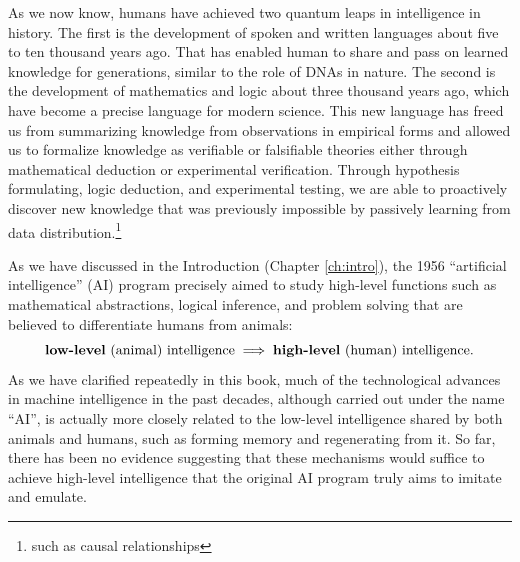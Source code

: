 \documentclass[../../book-main.tex]{subfiles}
\begin{document}




As we now know, humans have achieved two quantum leaps in intelligence in history. The first is the development of spoken and written languages about five to ten thousand years ago. That has enabled human to share and pass on learned knowledge for generations, similar to the role of DNAs in nature. The second is the development of mathematics and logic about three thousand years ago, which have become a precise language for modern science. This new language has freed us from summarizing knowledge from observations in empirical forms and allowed us to formalize knowledge as verifiable or falsifiable theories either through mathematical deduction or experimental verification. Through hypothesis formulating, logic deduction, and experimental testing, we are able to proactively discover new knowledge that was previously impossible by passively learning from data distribution.\footnote{such as causal relationships}

As we have discussed in the Introduction (Chapter \ref{ch:intro}), the 1956 ``artificial intelligence'' (AI) program precisely aimed to study high-level functions such as mathematical abstractions, logical inference, and problem solving that are believed to differentiate humans from animals: 
\begin{equation}
   \mbox{\textbf{low-level} (animal) intelligence} \; \Longrightarrow \; 
   \mbox{\textbf{high-level} (human) intelligence.}
\end{equation}
As we have clarified repeatedly in this book, much of the technological advances in machine intelligence in the past decades, although carried out under the name ``AI'', is actually more closely related to the low-level intelligence shared by both animals and humans, such as forming memory and regenerating from it. So far, there has been no evidence suggesting that these mechanisms would suffice to achieve high-level intelligence that the original AI program truly aims to imitate and emulate. 
\end{document}
